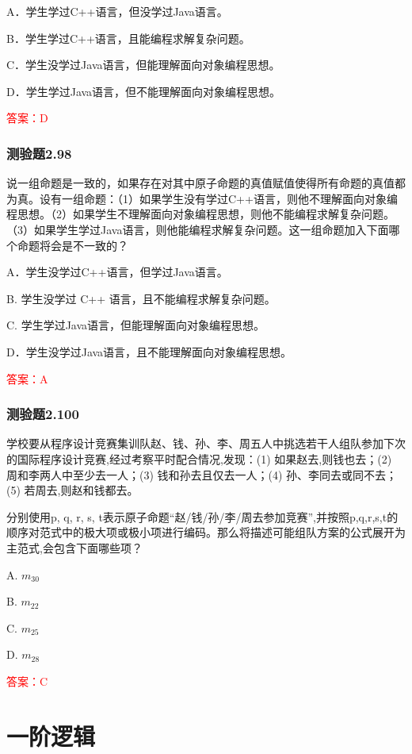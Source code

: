 \documentclass[UTF8, heading=true]{ctexart}
\begin{document}
A．学生学过C++语言，但没学过Java语言。

B．学生学过C++语言，且能编程求解复杂问题。

C．学生没学过Java语言，但能理解面向对象编程思想。

D．学生学过Java语言，但不能理解面向对象编程思想。

\textcolor{red}{答案：D}

\subsubsection{测验题2.98}

说一组命题是一致的，如果存在对其中原子命题的真值赋值使得所有命题的真值都为真。设有一组命题：（1）如果学生没有学过C++语言，则他不理解面向对象编程思想。（2）如果学生不理解面向对象编程思想，则他不能编程求解复杂问题。（3）如果学生学过Java语言，则他能编程求解复杂问题。这一组命题加入下面哪个命题将会是不一致的？

A．学生没学过C++语言，但学过Java语言。

B. 学生没学过 C++ 语言，且不能编程求解复杂问题。

C. 学生学过Java语言，但能理解面向对象编程思想。

D．学生没学过Java语言，且不能理解面向对象编程思想。

\textcolor{red}{答案：A}

\subsubsection{测验题2.100}

学校要从程序设计竞赛集训队赵、钱、孙、李、周五人中挑选若干人组队参加下次的国际程序设计竞赛,经过考察平时配合情况,发现：(1) 如果赵去,则钱也去；(2) 周和李两人中至少去一人；(3) 钱和孙去且仅去一人；(4) 孙、李同去或同不去；(5) 若周去,则赵和钱都去。

分别使用p, q, r, s, t表示原子命题“赵/钱/孙/李/周去参加竞赛”,并按照p,q,r,s,t的顺序对范式中的极大项或极小项进行编码。那么将描述可能组队方案的公式展开为主范式,会包含下面哪些项？

A. $ m_{30}$

B. $ m_{22}$

C. $ m_{25}$

D. $ m_{28}$

\textcolor{red}{答案：C}


\clearpage
\section{一阶逻辑}
\end{document}
